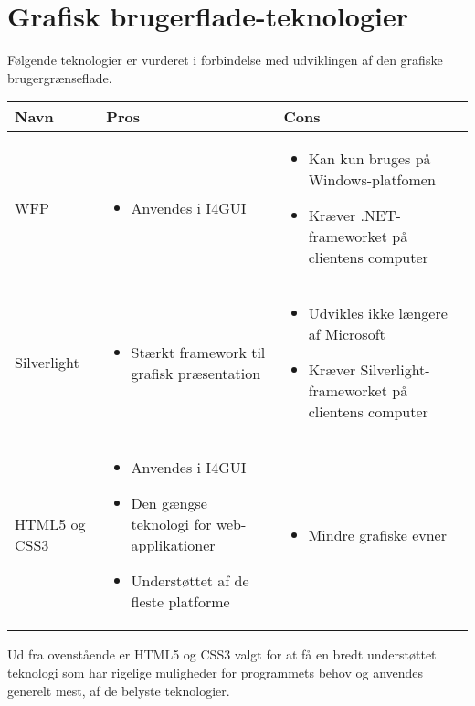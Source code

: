 \section{Grafisk brugerflade-teknologier}

Følgende teknologier er vurderet i forbindelse med udviklingen af den grafiske brugergrænseflade.

\begin{tabular}{|p{3cm}|p{5.5cm}|p{5.5cm}|}
\hline 
\textbf{Navn} & \textbf{Pros} & \textbf{Cons} \\ 
\hline

WFP
	&
	\begin{itemize}
		\item Anvendes i I4GUI
	\end{itemize}
	&
	\begin{itemize}
		\item Kan kun bruges på Windows-platfomen
		\item Kræver .NET-frameworket på clientens computer
	\end{itemize}
	\\
	\hline

Silverlight
	&
	\begin{itemize}
		\item Stærkt framework til grafisk præsentation
	\end{itemize}
	&
	\begin{itemize}
		\item Udvikles ikke længere af Microsoft
		\item Kræver Silverlight-\newline frameworket på clientens computer
	\end{itemize}
	\\
	\hline

HTML5 og CSS3
	&
	\begin{itemize}
		\item Anvendes i I4GUI
		\item Den gængse teknologi for web-applikationer
		\item Understøttet af de fleste platforme
	\end{itemize}
	&
	\begin{itemize}
	\item Mindre grafiske evner
	\end{itemize}
	\\
	\hline
\end{tabular} 

Ud fra ovenstående er HTML5 og CSS3 valgt for at få en bredt understøttet teknologi som har rigelige muligheder for programmets behov og anvendes generelt mest, af de belyste teknologier.